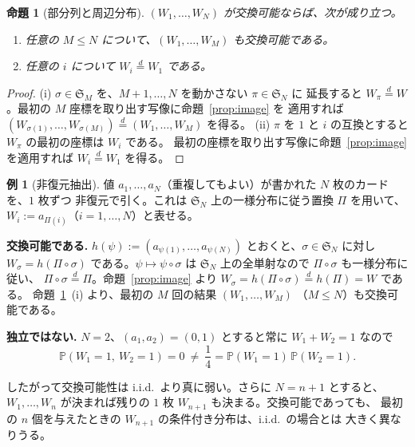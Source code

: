 \documentclass[a4paper,11pt]{jsarticle}
\theoremstyle{definition}
\newtheorem{example}[definition]{例}
\theoremstyle{plain}
\newtheorem{proposition}[definition]{命題}
\theoremstyle{remark}
\newcommand{\Prob}{\mathbb{P}}
\newcommand{\eqd}{\overset{d}{=}}               %
\begin{document}
\begin{proposition}[部分列と周辺分布]
  \label{prop:subvector}
  $(W_1,\dots,W_N)$ が交換可能ならば、次が成り立つ。
  \begin{enumerate}
    \item[(i)] 任意の $M\le N$ について、$(W_1,\dots,W_M)$ も交換可能である。
    \item[(ii)] 任意の $i$ について $W_i\eqd W_1$ である。
  \end{enumerate}
\end{proposition}

\begin{proof}
  (i) $\sigma\in\mathfrak{S}_M$ を、$M+1,\dots,N$ を動かさない $\pi\in\mathfrak{S}_N$ に
  延長すると $W_\pi\eqd W$。最初の $M$ 座標を取り出す写像に命題~\ref{prop:image} を
  適用すれば $(W_{\sigma(1)},\dots,W_{\sigma(M)})\eqd(W_1,\dots,W_M)$ を得る。
  (ii) $\pi$ を $1$ と $i$ の互換とすると $W_\pi$ の最初の座標は $W_i$ である。
  最初の座標を取り出す写像に命題~\ref{prop:image} を適用すれば $W_i\eqd W_1$ を得る。
\end{proof}

\begin{example}[非復元抽出]
  \label{ex:without-replacement}
  値 $a_1,\dots,a_N$（重複してもよい）が書かれた $N$ 枚のカードを、$1$ 枚ずつ
  非復元で引く。これは $\mathfrak{S}_N$ 上の一様分布に従う置換 $\Pi$ を用いて、
  $W_i:=a_{\Pi(i)}$（$i=1,\dots,N$）と表せる。

  \textbf{交換可能である.}
  $h(\psi):=(a_{\psi(1)},\dots,a_{\psi(N)})$ とおくと、$\sigma\in\mathfrak{S}_N$ に対し
  $W_\sigma=h(\Pi\circ\sigma)$ である。$\psi\mapsto\psi\circ\sigma$ は
  $\mathfrak{S}_N$ 上の全単射なので $\Pi\circ\sigma$ も一様分布に従い、
  $\Pi\circ\sigma\eqd\Pi$。命題~\ref{prop:image} より
  $W_\sigma=h(\Pi\circ\sigma)\eqd h(\Pi)=W$ である。
  命題~\ref{prop:subvector}~(i) より、最初の $M$ 回の結果 $(W_1,\dots,W_M)$
  （$M\le N$）も交換可能である。

  \textbf{独立ではない.}
  $N=2$、$(a_1,a_2)=(0,1)$ とすると常に $W_1+W_2=1$ なので
  \begin{equation*}
    \Prob(W_1=1,\ W_2=1)=0\ \ne\ \frac14=\Prob(W_1=1)\,\Prob(W_2=1).
  \end{equation*}

  したがって交換可能性は i.i.d.\ より真に弱い。さらに $N=n+1$ とすると、
  $W_1,\dots,W_n$ が決まれば残りの $1$ 枚 $W_{n+1}$ も決まる。交換可能であっても、
  最初の $n$ 個を与えたときの $W_{n+1}$ の条件付き分布は、i.i.d.\ の場合とは
  大きく異なりうる。
\end{example}
\end{document}

